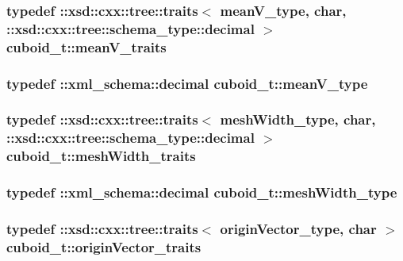 \hypertarget{classcuboid__t_ad39df1b8bcb315153993a8993dc0828c}{
\subsubsection[{mean\-V\-\_\-traits}]{\setlength{\rightskip}{0pt plus 5cm}typedef \-::xsd\-::cxx\-::tree\-::traits$<$ {\bf mean\-V\-\_\-type}, char, \-::xsd\-::cxx\-::tree\-::schema\-\_\-type\-::decimal $>$ {\bf cuboid\-\_\-t\-::mean\-V\-\_\-traits}}}\label{classcuboid__t_ad39df1b8bcb315153993a8993dc0828c}
\hypertarget{classcuboid__t_aea1381b8b1cca3f677ae4a28b29cbe2a}{
\subsubsection[{mean\-V\-\_\-type}]{\setlength{\rightskip}{0pt plus 5cm}typedef \-::{\bf xml\-\_\-schema\-::decimal} {\bf cuboid\-\_\-t\-::mean\-V\-\_\-type}}}\label{classcuboid__t_aea1381b8b1cca3f677ae4a28b29cbe2a}
\hypertarget{classcuboid__t_a7407ec25461e872616716771073fdd6b}{
\subsubsection[{mesh\-Width\-\_\-traits}]{\setlength{\rightskip}{0pt plus 5cm}typedef \-::xsd\-::cxx\-::tree\-::traits$<$ {\bf mesh\-Width\-\_\-type}, char, \-::xsd\-::cxx\-::tree\-::schema\-\_\-type\-::decimal $>$ {\bf cuboid\-\_\-t\-::mesh\-Width\-\_\-traits}}}\label{classcuboid__t_a7407ec25461e872616716771073fdd6b}
\hypertarget{classcuboid__t_a5759759b1b9e3029ff36c7f20d9213dc}{
\subsubsection[{mesh\-Width\-\_\-type}]{\setlength{\rightskip}{0pt plus 5cm}typedef \-::{\bf xml\-\_\-schema\-::decimal} {\bf cuboid\-\_\-t\-::mesh\-Width\-\_\-type}}}\label{classcuboid__t_a5759759b1b9e3029ff36c7f20d9213dc}
\hypertarget{classcuboid__t_a88fa351b02759f012d3dc7cabd2097b8}{
\subsubsection[{origin\-Vector\-\_\-traits}]{\setlength{\rightskip}{0pt plus 5cm}typedef \-::xsd\-::cxx\-::tree\-::traits$<$ {\bf origin\-Vector\-\_\-type}, char $>$ {\bf cuboid\-\_\-t\-::origin\-Vector\-\_\-traits}}}\label{classcuboid__t_a88fa351b02759f012d3dc7cabd2097b8}
